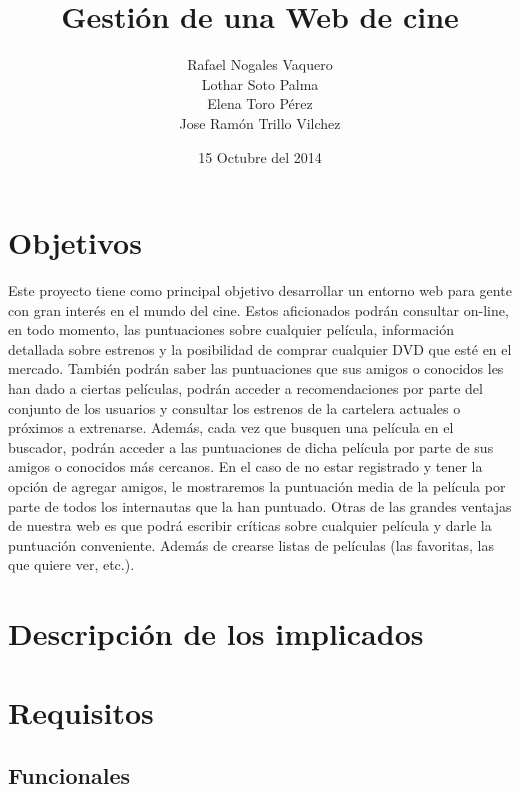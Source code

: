 \documentclass{article}
\title{Gestión de una Web de cine}
\author{Rafael Nogales Vaquero
\\Lothar Soto Palma
\\Elena Toro Pérez
\\Jose Ramón Trillo Vilchez}
\date{15 Octubre del 2014}
\begin{document}
\maketitle

\section{Objetivos}
Este proyecto tiene como principal objetivo desarrollar un entorno web para gente con gran interés en el mundo del cine.
Estos aficionados podrán consultar on-line, en todo momento, las puntuaciones sobre cualquier película, información
detallada sobre estrenos y la posibilidad de comprar cualquier DVD que esté en el mercado.
También podrán saber las puntuaciones que sus amigos o conocidos les han dado a ciertas películas, podrán acceder a
recomendaciones por parte del conjunto de los usuarios y consultar los estrenos de la cartelera actuales o próximos a
extrenarse.
Además, cada vez que busquen una película en el buscador, podrán acceder a las puntuaciones de dicha película por parte de
sus amigos o conocidos más cercanos.
En el caso de no estar registrado y tener la opción de agregar amigos, le mostraremos la puntuación media de la película
por parte de todos los internautas que la han puntuado.
Otras de las grandes ventajas de nuestra web es que podrá escribir críticas sobre cualquier película y darle la puntuación
conveniente. Además de crearse listas de películas (las favoritas, las que quiere ver, etc.).
\section{Descripción de los implicados}
\section{Requisitos}
    \subsection{Funcionales}
\end{document}
